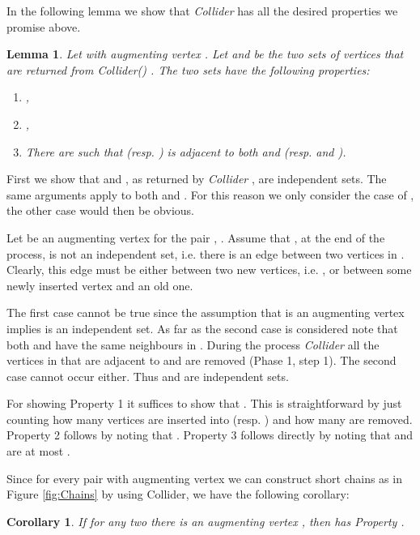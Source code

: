 \documentclass[a4paper,10pt]{article}
\makeatletter
\newtheorem{corollary}{Corollary}\renewcommand{\thecorollary}{\arabic{corollary}}
\newtheorem{lemma}{Lemma}\renewcommand{\thelemma}{\arabic{lemma}}
\newenvironment{proof}{\noindent{\bf Proof\@:}}{\hfill \\}
\makeatother
\begin{document}
In the following lemma we show that {\em Collider} has all the
desired properties we promise above.


\begin{lemma}\label{lemma:TrnsfrmProperties}
Let  with augmenting vertex .
Let  and  be the two sets of vertices that are 
returned from {\em Collider()} .
The two sets have the following properties:
\begin{enumerate}
	\item ,
	\item ,
	\item There are  
	such that  (resp. ) is adjacent to both 
	 and  (resp.  and ).
\end{enumerate}
\end{lemma}
\begin{proof}
First we show that  and , as returned by {\em Collider
}, are independent sets. The same arguments
apply to both  and . For this reason we only consider 
the case of , the other case would then be obvious.


Let  be an augmenting vertex for the pair , .
Assume that , at the end of the process, is not 
an independent set, i.e. there is an edge between
two vertices in . Clearly, this edge must be either 
between two new vertices, i.e. , or
between some  newly inserted vertex  and an old one.


The first case cannot be true since the assumption that 
is an augmenting vertex implies 
is an independent set. As far as the second case is considered note that both 
and  have the same neighbours in . During the
process {\em Collider} all the vertices in 
 that are adjacent to  and  are removed
(Phase 1, step 1).  The second case cannot occur either. 
Thus  and  are independent sets.


For showing Property 1 it suffices to show that .
This is straightforward by just counting how many vertices are inserted
into  (resp. ) and how many are removed. Property 2
follows by noting that .
Property 3 follows directly by noting that  and
 are at most .
\end{proof}


\noindent
Since for every pair  with
augmenting vertex we can construct short chains as in Figure
\ref{fig:Chains} by using Collider, we have the following corollary:


\begin{corollary}\label{cor:Augment2GProperty}
If for any two  there is an
{\em augmenting} vertex , then  has Property
.
\end{corollary}
\end{document}
